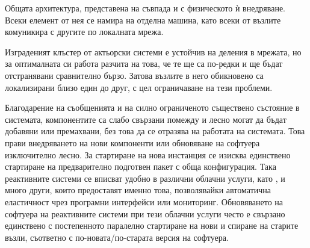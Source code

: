 Общата архитектура, представена на  съвпада и с физическото ѝ внедряване. Всеки елемент от нея се намира на отделна машина, като всеки от възлите комуникира с другите по локалната мрежа.

Изграденият клъстер от актьорски системи е устойчив на деления в мрежата, но за оптималната си работа разчита на това, че те ще са по-редки и ще бъдат отстранявани сравнително бързо. Затова възлите в него обикновено са локализирани близо един до друг, с цел ограничаване на тези проблеми.

Благодарение на съобщенията и на силно ограниченото съществено състояние в системата, компонентите са слабо свързани помежду и лесно могат да бъдат добавяни или премахвани, без това да се отразява на работата на системата. Това прави внедряването на нови компоненти или обновяване на софтуера изключително лесно. За стартиране на нова инстанция се изисква единствено стартиране на предварително подготвен пакет с обща конфигурация. Така реактивните системи се вписват удобно в различни облачни услуги, като ,  и много други, които предоставят именно това, позволявайки автоматична еластичност чрез програмни интерфейси или мониторинг. Обновяването на софтуера на реактивните системи при тези облачни услуги често е свързано единствено с постепенното паралелно стартиране на нови и спиране на старите възли, съответно с по-новата/по-старата версия на софтуера.